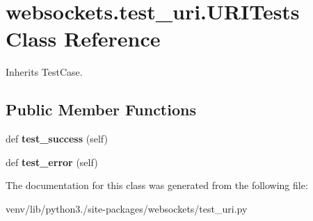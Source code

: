 \hypertarget{classwebsockets_1_1test__uri_1_1_u_r_i_tests}{}\section{websockets.\+test\+\_\+uri.\+U\+R\+I\+Tests Class Reference}
\label{classwebsockets_1_1test__uri_1_1_u_r_i_tests}


Inherits Test\+Case.

\subsection*{Public Member Functions}
\begin{DoxyCompactItemize}
\item 
\mbox{\label{classwebsockets_1_1test__uri_1_1_u_r_i_tests_a2a4787e833f9f209a85d909a2a5496de}} 
def {\bfseries test\+\_\+success} (self)
\item 
\mbox{\label{classwebsockets_1_1test__uri_1_1_u_r_i_tests_a1c4d26df43ba20e14b9df341a6cb9dfc}} 
def {\bfseries test\+\_\+error} (self)
\end{DoxyCompactItemize}


The documentation for this class was generated from the following file\+:\begin{DoxyCompactItemize}
\item 
venv/lib/python3./site-\/packages/websockets/test\+\_\+uri.\+py\end{DoxyCompactItemize}
